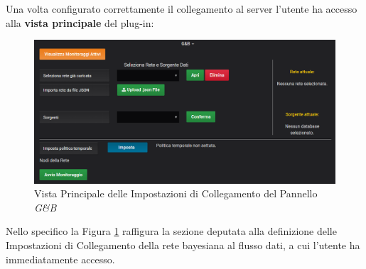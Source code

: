 Una volta configurato correttamente il collegamento al server l'utente ha accesso alla \textbf{vista principale} del plug-in:
\begin{figure}[H]
	\begin{center}
		\includegraphics[scale=0.64]{./images/Panel.png}
		 \caption{Vista Principale delle Impostazioni di Collegamento del Pannello \textit{G\&B}}	
		 \label{Pannello}
	\end{center}
\end{figure}

Nello specifico la Figura \ref{Pannello} raffigura la sezione deputata alla definizione delle Impostazioni di Collegamento della rete bayesiana al flusso dati, a cui l'utente ha immediatamente accesso.
